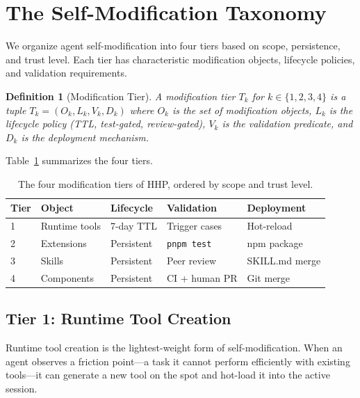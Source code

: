 \documentclass[11pt]{article}
\newtheorem{definition}{Definition}
\begin{document}
\section{The Self-Modification Taxonomy}
\label{sec:taxonomy}

We organize agent self-modification into four tiers based on scope, persistence,
and trust level. Each tier has characteristic modification objects, lifecycle
policies, and validation requirements.

\begin{definition}[Modification Tier]
A \emph{modification tier} $T_k$ for $k \in \{1, 2, 3, 4\}$ is a tuple
$T_k = (O_k, L_k, V_k, D_k)$ where $O_k$ is the set of modification objects,
$L_k$ is the lifecycle policy (TTL, test-gated, review-gated), $V_k$ is the
validation predicate, and $D_k$ is the deployment mechanism.
\end{definition}

Table~\ref{tab:tiers} summarizes the four tiers.

\begin{table}[H]
\centering
\begin{tabularx}{\textwidth}{l X X X X}
\toprule
Tier & Object & Lifecycle & Validation & Deployment \\
\midrule
1 & Runtime tools & 7-day TTL & Trigger cases & Hot-reload \\
2 & Extensions & Persistent & \texttt{pnpm test} & npm package \\
3 & Skills & Persistent & Peer review & SKILL.md merge \\
4 & Components & Persistent & CI + human PR & Git merge \\
\bottomrule
\end{tabularx}
\caption{The four modification tiers of HHP, ordered by scope and trust level.}
\label{tab:tiers}
\end{table}

\subsection{Tier 1: Runtime Tool Creation}
\label{sec:tier1}

Runtime tool creation is the lightest-weight form of self-modification. When an
agent observes a friction point---a task it cannot perform efficiently with
existing tools---it can generate a new tool on the spot and hot-load it into the
active session.
\end{document}
